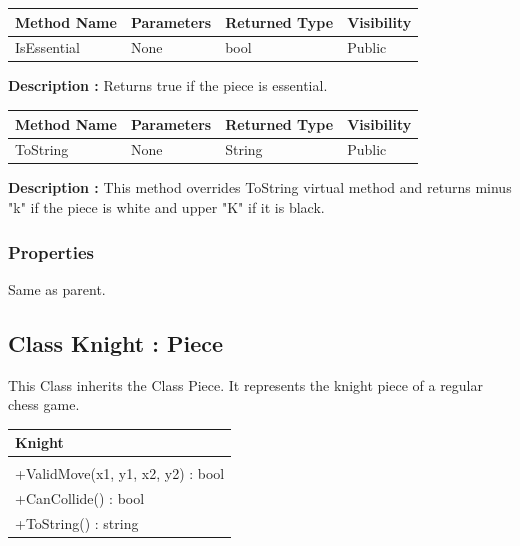 \documentclass[12pt]{article}
\begin{document}
\begin{table}[H]
    \begin{tabular}{|l|l|l|l|}
    \hline
    \rowcolor[HTML]{EFEFEF} 
    \cellcolor[HTML]{EFEFEF}\textbf{Method Name} & \textbf{Parameters}  & \textbf{Returned Type} & \textbf{Visibility} \\ \hline
    IsEssential                                  & None                 & bool                   & Public              \\ \hline
    \end{tabular}
\end{table}

\textbf{Description :} Returns true if the piece is essential.

\begin{table}[H]
    \begin{tabular}{|l|l|l|l|}
    \hline
    \rowcolor[HTML]{EFEFEF} 
    \cellcolor[HTML]{EFEFEF}\textbf{Method Name} & \textbf{Parameters}  & \textbf{Returned Type} & \textbf{Visibility} \\ \hline
    ToString                                   & None                 & String                   & Public              \\ \hline
    \end{tabular}
\end{table}

\textbf{Description :} This method overrides ToString virtual
method and returns minus "k" if the piece is white and upper "K"
if it is black.

\subsubsection{Properties}

Same as parent.
\newpage


\subsection{Class Knight : Piece}

This Class inherits the Class Piece. It represents the knight 
piece of a regular chess game.
\begin{table}[H]
    \begin{tabular}{|l|}
    \hline
    \cellcolor[HTML]{C0C0C0}\textbf{Knight} \\ \hline
    \cellcolor[HTML]{EFEFEF}                    \\ \hline
    +ValidMove(x1, y1, x2, y2) : bool           \\ \hline
    +CanCollide() : bool                        \\ \hline
    +ToString() : string                        \\ \hline
    \end{tabular}
\end{table}
\end{document}
